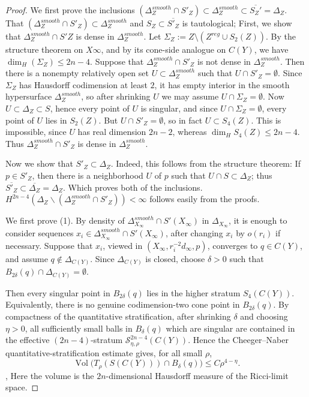 \documentclass[11pt]{amsart}
\theoremstyle{definition}
\theoremstyle{remark}
\begin{document}
\begin{proof}
We first prove the inclusions $(\Delta_Z^{smooth} \cap S'_Z) \subset \Delta_Z^{smooth} \subset  \overline{S_Z'} = \Delta_Z$. That $(\Delta_Z^{smooth} \cap S'_Z) \subset \Delta_Z^{smooth}$ and $S_Z \subset \overline{S'_Z}$ is tautological; First, we show that $\Delta_Z^{smooth} \cap S'Z$ is dense in $\Delta_Z^{smooth}$. Let $\Sigma_Z := Z \setminus (Z^{reg} \cup S_2(Z))$. By the structure theorem on $X\infty$, and by its cone-side analogue on $C(Y)$, we have $\dim_H(\Sigma_Z) \leq 2n-4$. Suppose that $\Delta_Z^{smooth} \cap S'_Z$ is not dense in $\Delta_Z^{smooth}$. Then there is a nonempty relatively open set $U \subset \Delta_Z^{smooth}$ such that $U \cap S'_Z = \emptyset$. Since $\Sigma_Z$ has Hausdorff codimension at least $2$, it has empty interior in the smooth hypersurface $\Delta_Z^{smooth}$, so after shrinking $U$ we may assume $U \cap \Sigma_Z = \emptyset$. Now $U \subset \Delta_Z \subset S$, hence every point of $U$ is singular, and since $U \cap \Sigma_Z = \emptyset$, every point of $U$ lies in $S_2(Z)$. But $U \cap S'_Z = \emptyset$, so in fact $U \subset S_4(Z)$. This is impossible, since $U$ has real dimension $2n-2$, whereas $\dim_H S_4(Z) \leq 2n-4$. Thus $\Delta_Z^{smooth} \cap S'_Z$ is dense in $\Delta_Z^{smooth}$.

Now we show that $S'_Z \subset \Delta_Z$. Indeed, this follows from the structure theorem: If $p \in S'_Z$, then there is a neighborhood $U$ of $p$ such that $U \cap S \subset \Delta_Z$; thus $\overline{S'_Z} \subset \overline{\Delta_Z} = \Delta_Z$. Which proves both of the inclusions. $H^{2n-4}(\Delta_Z \backslash (\Delta_Z^{smooth} \cap S'_Z)) < \infty $ follows easily from the proofs.

We first prove (1). By density of $\Delta_{X_\infty}^{smooth}\cap S'(X_\infty)$
in $\Delta_{X_\infty}$, it is enough to consider sequences
$x_i\in \Delta_{X_\infty}^{smooth}\cap S'(X_\infty)$, after changing $x_i$ by
$o(r_i)$ if necessary. Suppose that $x_i$, viewed in
$(X_\infty,r_i^{-2}d_\infty,p)$, converges to $q\in C(Y)$, and assume
$q\notin\Delta_{C(Y)}$. Since $\Delta_{C(Y)}$ is closed, choose
$\delta>0$ such that $B_{2\delta}(q)\cap\Delta_{C(Y)}=\emptyset$.

Then every singular point in $B_{2\delta}(q)$ lies in the higher stratum
$S_4(C(Y))$. Equivalently, there is no genuine codimension-two cone point in
$B_{2\delta}(q)$. By compactness of the quantitative stratification, after
shrinking $\delta$ and choosing $\eta>0$, all sufficiently small balls in
$B_\delta(q)$ which are singular are contained in the effective
$(2n-4)$-stratum $\mathcal S^{2n-4}_{\eta,\rho}(C(Y))$. Hence the Cheeger--Naber quantitative-stratification estimate
\cite{CheegerNaberQuant} gives, for all small $\rho$,
\[
        \operatorname{Vol}\bigl(T_\rho(S(C(Y)))\cap B_\delta(q)\bigr)
        \leq C\rho^{4-\eta}.
\],
Here the volume is the $2n$-dimensional Hausdorff measure of the Ricci-limit
space.


\end{proof}
\end{document}
